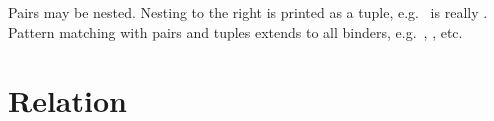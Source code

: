 \begin{isabellebody}
\begin{isamarkuptext}
Pairs may be nested. Nesting to the right is printed as a tuple,
e.g.\ \mbox{} is really \mbox{.}
Pattern matching with pairs and tuples extends to all binders,
e.g.\ \mbox{,} , etc.


\section{Relation}


\end{isamarkuptext}
\end{isabellebody}

